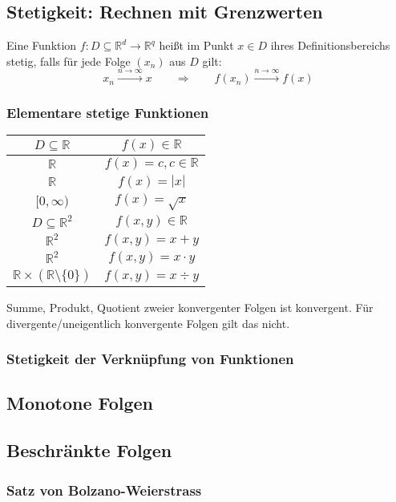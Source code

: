 \documentclass[10pt,a4paper^, twocolumn]{article}
\begin{document}
\subsection{Stetigkeit: Rechnen mit Grenzwerten}
	Eine Funktion $f : D \subseteq \mathbb{R}^d \to \mathbb{R}^q$ heißt 
	im Punkt $x \in D$ ihres Definitionsbereichs stetig, falls für jede Folge 
	$(x_n)$ aus $D$ gilt:
	$$
		x_n \overset{n \to \infty}{\to} x
		\qquad \Rightarrow \qquad
		f(x_n) \overset{n \to \infty}{\to} f(x)
	$$
	\subsubsection{Elementare stetige Funktionen}
	\begin{center}
	\newcommand{\infowidth}{2cm}
	\newcommand{\aufsichtwidth}{10cm}
	\begin{tabular}{|c|c|}
	\hline
	$D \subseteq \mathbb{R}$ &  $f(x) \in \mathbb{R}$ \\
	\hline
	$\mathbb{R}$ & $f(x) = c, c \in \mathbb{R}$\\
	$\mathbb{R}$ & $f(x) = |x|$\\
	$[0, \infty)$& $f(x) = \sqrt{x}$\\
	\hline
	$D \subseteq \mathbb{R}^2$ &  $f(x, y) \in \mathbb{R}$ \\
	\hline
	$\mathbb{R}^2$ & $f(x, y) = x+y$\\
	$\mathbb{R}^2$ & $f(x, y) = x \cdot y$\\
	$\mathbb{R} \times (\mathbb{R} \setminus \{0\}) $ & $f(x, y) = x \div y$\\
	\hline
	\end{tabular}
	\end{center}
	Summe, Produkt, Quotient zweier konvergenter Folgen ist konvergent. Für
	divergente/uneigentlich konvergente Folgen gilt das nicht.
	\subsubsection{Stetigkeit der Verknüpfung von Funktionen}
		
\subsection{Monotone Folgen}
\subsection{Beschränkte Folgen}
\subsubsection{Satz von Bolzano-Weierstrass}
\end{document}

